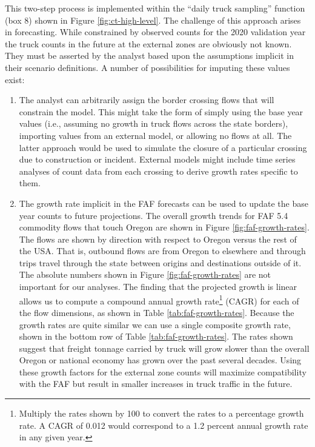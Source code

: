 This two-step process is implemented within the ``daily truck sampling'' function (box 8) shown in Figure \ref{fig:ct-high-level}. The challenge of this approach arises in forecasting. While constrained by observed counts for the 2020 validation year the truck counts in the future at the external zones are obviously not known. They must be asserted by the analyst based upon the assumptions implicit in their scenario definitions. A number of possibilities for imputing these values exist:
\begin{enumerate}
    \item The analyst can arbitrarily assign the border crossing flows that will constrain the model. This might take the form of simply using the base year values (i.e., assuming no growth in truck flows across the state borders), importing values from an external model, or allowing no flows at all. The latter approach would be used to simulate the closure of a particular crossing due to construction or incident. External models might include time series analyses of count data from each crossing to derive growth rates specific to them.
    \item The growth rate implicit in the FAF forecasts can be used to update the base year counts to future projections. The overall growth trends for FAF 5.4 commodity flows that touch Oregon are shown in Figure \ref{fig:faf-growth-rates}. The flows are shown by direction with respect to Oregon versus the rest of the USA. That is, outbound flows are from Oregon to elsewhere and through trips travel through the state between origins and destinations outside of it. The absolute numbers shown in Figure \ref{fig:faf-growth-rates} are not important for our analyses. The finding that the projected  growth is linear allows us to compute a compound annual growth rate\footnote{Multiply the rates shown by 100 to convert the rates to a percentage growth rate. A CAGR of 0.012 would correspond to a 1.2 percent annual growth rate in any given year.} (CAGR) for each of the flow dimensions, as shown in Table \ref{tab:faf-growth-rates}. Because the growth rates are quite similar we can use a single composite growth rate, shown in the bottom row of Table \ref{tab:faf-growth-rates}. The rates shown suggest that freight tonnage carried by truck will grow slower than the overall Oregon or national economy has grown over the past several decades. Using these growth factors for the external zone counts will maximize compatibility with the FAF but result in smaller increases in truck traffic in the future.


\end{enumerate}

